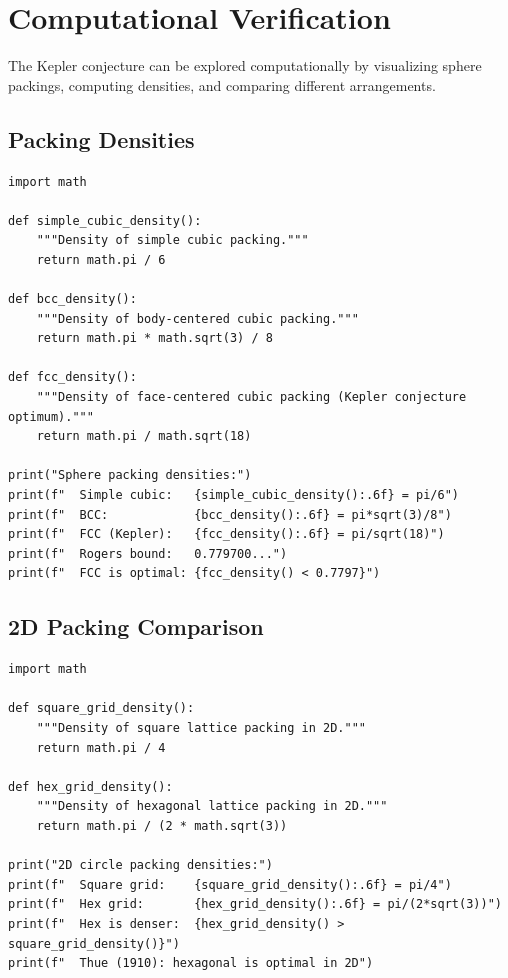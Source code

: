 \section{Computational Verification}

The Kepler conjecture can be explored computationally by visualizing sphere packings, computing densities, and comparing different arrangements.

\subsection{Packing Densities}

\begin{verbatim}
import math

def simple_cubic_density():
    """Density of simple cubic packing."""
    return math.pi / 6

def bcc_density():
    """Density of body-centered cubic packing."""
    return math.pi * math.sqrt(3) / 8

def fcc_density():
    """Density of face-centered cubic packing (Kepler conjecture optimum)."""
    return math.pi / math.sqrt(18)

print("Sphere packing densities:")
print(f"  Simple cubic:   {simple_cubic_density():.6f} = pi/6")
print(f"  BCC:            {bcc_density():.6f} = pi*sqrt(3)/8")
print(f"  FCC (Kepler):   {fcc_density():.6f} = pi/sqrt(18)")
print(f"  Rogers bound:   0.779700...")
print(f"  FCC is optimal: {fcc_density() < 0.7797}")
\end{verbatim}

\subsection{2D Packing Comparison}

\begin{verbatim}
import math

def square_grid_density():
    """Density of square lattice packing in 2D."""
    return math.pi / 4

def hex_grid_density():
    """Density of hexagonal lattice packing in 2D."""
    return math.pi / (2 * math.sqrt(3))

print("2D circle packing densities:")
print(f"  Square grid:    {square_grid_density():.6f} = pi/4")
print(f"  Hex grid:       {hex_grid_density():.6f} = pi/(2*sqrt(3))")
print(f"  Hex is denser:  {hex_grid_density() > square_grid_density()}")
print(f"  Thue (1910): hexagonal is optimal in 2D")
\end{verbatim}

